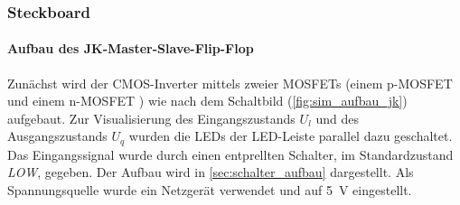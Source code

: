 \documentclass[12pt,english,ngerman]{scrartcl}
\begin{document}
\subsubsection{Steckboard}
\paragraph{Aufbau des JK-Master-Slave-Flip-Flop}\label{sec:mess_cmos}
Zunächst wird der CMOS-Inverter mittels zweier MOSFETs (einem p-MOSFET \cite{ZVP2106A} und
einem n-MOSFET \cite{ZVN2106A}) wie nach dem Schaltbild (\autoref{fig:sim_aufbau_jk})
aufgebaut. Zur Visualisierung des Eingangszustands $U_l$ und des
Ausgangszustands $U_q$ wurden die LEDs der LED-Leiste parallel dazu geschaltet. Das
Eingangssignal wurde durch einen entprellten Schalter, im Standardzustand
\textit{LOW}, gegeben. Der Aufbau wird in \autoref{sec:schalter_aufbau} dargestellt. Als
Spannungsquelle wurde ein Netzgerät verwendet und auf \SI{5}{\volt}
eingestellt. 
\end{document}

